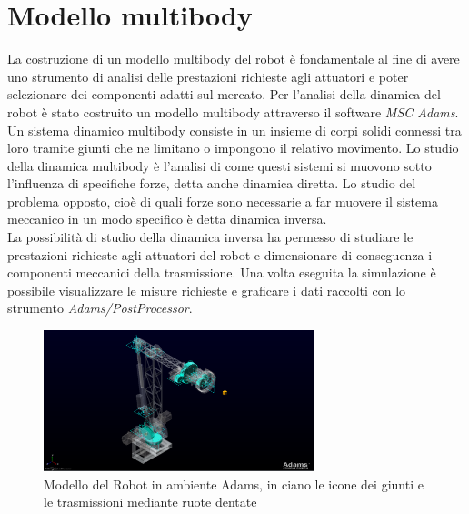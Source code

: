 \documentclass[%
corpo=11pt,
twoside,
 stile=classica,
oldstyle,
greek,%
]{toptesi}
\begin{document}
	\section{Modello multibody}
	La costruzione di un modello multibody del robot è fondamentale al fine di avere uno strumento di analisi delle prestazioni richieste agli attuatori e poter selezionare dei componenti adatti sul mercato. 
	Per l'analisi della dinamica del robot è stato costruito un modello multibody attraverso il software \textit{MSC Adams}. \\
	Un sistema dinamico multibody consiste in un insieme di corpi solidi connessi tra loro tramite giunti che ne limitano o impongono il relativo movimento. Lo studio della dinamica multibody è l’analisi di come questi sistemi si muovono sotto l’influenza di specifiche forze, detta anche dinamica diretta. Lo studio del problema opposto, cioè di quali forze sono necessarie a far muovere il sistema meccanico in un modo specifico è detta dinamica inversa.\\
	La possibilità di studio della dinamica inversa ha permesso di studiare le prestazioni richieste agli attuatori del robot e dimensionare di conseguenza i componenti meccanici della trasmissione. 
	Una volta eseguita la simulazione è possibile visualizzare le misure richieste e graficare i dati raccolti con lo strumento \textit{Adams/PostProcessor}.  
		\begin{figure}
		\centering
		\includegraphics[width=0.7\textwidth]{Screen/Model1.png}
		\caption{Modello del Robot in ambiente Adams, in ciano le icone dei giunti e le trasmissioni mediante ruote dentate}
		\label{fig:adamsmodel}
	\end{figure}
	
\end{document}
